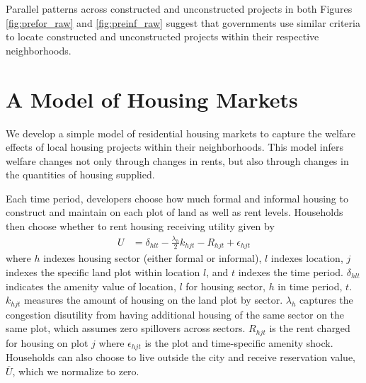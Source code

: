 \documentclass[12pt]{article}
\begin{document}
Parallel patterns across constructed and unconstructed projects in both Figures \ref{fig:prefor_raw} and \ref{fig:preinf_raw} suggest that governments use similar criteria to locate constructed and unconstructed projects within their respective neighborhoods.







\section{A Model of Housing Markets}\label{section:theory}

We develop a simple model of residential housing markets to capture the welfare effects of local housing projects within their neighborhoods.  This model infers welfare changes not only through changes in rents, but also through changes in the quantities of housing supplied.  




Each time period, developers choose how much formal and informal housing to construct and maintain on each plot of land as well as rent levels.  Households then choose whether to rent housing receiving utility given by
\begin{align*}
U &= \delta_{hlt} - \frac{\lambda_h}{2} k_{hjt} - R_{hjt}   + \epsilon_{hjt}  
\end{align*}
\noindent where $h$ indexes housing sector (either formal or informal), $l$ indexes location, $j$ indexes the specific land plot within location $l$, and $t$ indexes the time period.  $\delta_{hlt}$ indicates the amenity value of location, $l$ for housing sector, $h$ in time period, $t$.  $k_{hjt}$ measures the amount of housing on the land plot by sector.  $\lambda_{h}$ captures the congestion disutility from having additional housing of the same sector on the same plot, which assumes zero spillovers across sectors.   $R_{hjt}$ is the rent charged for housing on plot $j$ where $\epsilon_{hjt}$ is the plot and time-specific amenity shock.    Households can also choose to live outside the city and receive reservation value, $\overline{U}$, which we normalize to zero.  %
\end{document}
